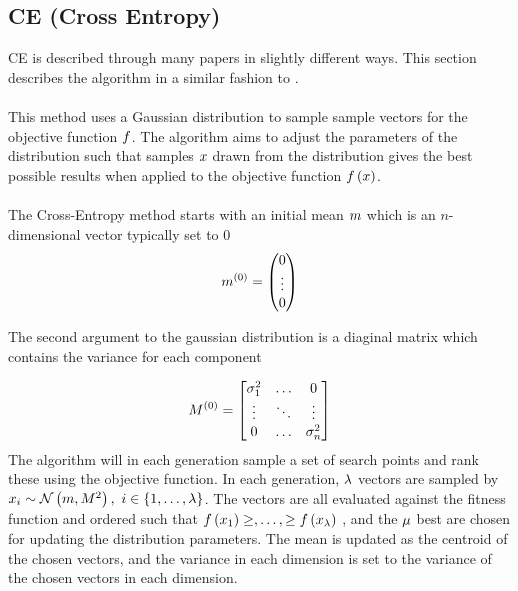 \subsection{CE (Cross Entropy) \label{CrossEntropy}}
CE is described through many papers in 
slightly different ways. This section
describes the algorithm in a similar fashion 
to \citep{thiery:09}.\\
\\
This method uses a Gaussian distribution to 
sample sample vectors for the objective function
$f$. The algorithm aims to 
adjust the parameters of the distribution
such that samples $x$ drawn from the distribution
gives the best possible results when applied to the
objective function $f \left( x \right)$.\\
\\
The Cross-Entropy method starts with an initial 
mean $m$ which is an $n$-dimensional vector
typically set to 0
\begin{align*}
m^{(0)} = \begin{pmatrix}
0\\
\vdots\\
0
\end{pmatrix} 
\end{align*}

The second argument to the gaussian distribution is a 
diaginal matrix which contains the variance for each 
component

\begin{align*}
M^{(0)} =
\begin{bmatrix}
\sigma_1^{2} & \hdots & 0\\
\vdots & \ddots & \vdots\\
0 & \hdots & \sigma_{n}^{2}
\end{bmatrix}
\end{align*}
The algorithm will in each generation sample a set of search points
and rank these using the objective function.
In each generation, $\lambda$ vectors are sampled by 
$x_{i} \sim \mathcal{N} \left(m, M^{2} \right)
,\ i \in \{1,\dots,\lambda \}$. The vectors are all evaluated 
against the fitness function and ordered such that $f \left( x_{1} \right) \geq, \dots, \geq f \left( x_{\lambda} \right)$
, and the $\mu$ best are chosen for updating the distribution 
parameters. The mean is updated as the centroid of the chosen vectors, and
the variance in each dimension is set to the variance of the chosen vectors in each 
dimension.\\

